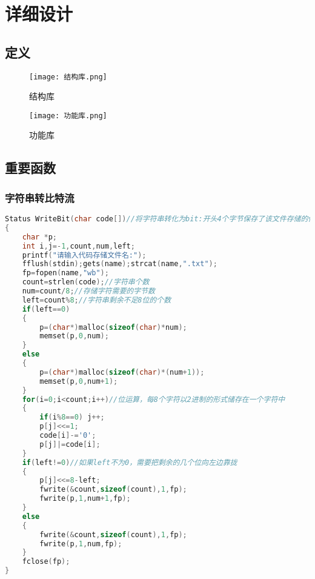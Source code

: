 \documentclass{DateStructure}
\begin{document}
\section{详细设计}
\subsection{定义}	
\begin{figure}[H] 
\centering
\texttt{[image: 结构库.png]}
\caption{结构库}	
\end{figure}
\begin{figure}[H] 
\centering
\texttt{[image: 功能库.png]}
\caption{功能库}	
\end{figure}

\subsection{重要函数}
\subsubsection{字符串转比特流}
\begin{lstlisting}[language=c,caption={WriteBit}]
Status WriteBit(char code[])//将字符串转化为bit:开头4个字节保存了该文件存储的位数，后面的字节为存储内容
{
    char *p;
    int i,j=-1,count,num,left;
    printf("请输入代码存储文件名:");
    fflush(stdin);gets(name);strcat(name,".txt");
    fp=fopen(name,"wb");
    count=strlen(code);//字符串个数
    num=count/8;//存储字符需要的字节数
    left=count%8;//字符串剩余不足8位的个数
    if(left==0)
    {
        p=(char*)malloc(sizeof(char)*num);
        memset(p,0,num);
    }
    else
    {
        p=(char*)malloc(sizeof(char)*(num+1));
        memset(p,0,num+1);
    }
    for(i=0;i<count;i++)//位运算，每8个字符以2进制的形式储存在一个字符中
    {
        if(i%8==0) j++;
        p[j]<<=1;
        code[i]-='0';
        p[j]|=code[i];
    }
    if(left!=0)//如果left不为0，需要把剩余的几个位向左边靠拢
    {
        p[j]<<=8-left;
        fwrite(&count,sizeof(count),1,fp);
        fwrite(p,1,num+1,fp);
    }
    else
    {
        fwrite(&count,sizeof(count),1,fp);
        fwrite(p,1,num,fp);
    }
    fclose(fp);
}
\end{lstlisting}
\end{document}
